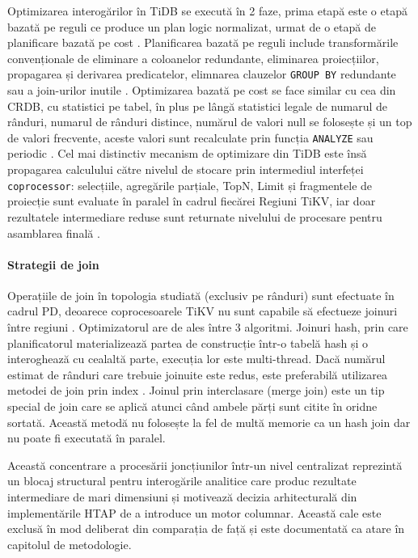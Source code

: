 Optimizarea interogărilor în TiDB se execută în 2 faze, prima etapă este o etapă bazată pe reguli ce produce un plan logic normalizat, urmat de o etapă de planificare bazată pe cost \cite{huangtidb2020}. Planificarea bazată pe reguli include transformările convenționale de eliminare a coloanelor redundante, eliminarea proiecțiilor, propagarea și derivarea predicatelor, elimnarea clauzelor \texttt{GROUP BY} redundante sau a join-urilor inutile \cite{huangtidb2020}. Optimizarea bazată pe cost se face similar cu cea din CRDB, cu statistici pe tabel, în plus pe lângă statistici legale de numarul de rânduri, numarul de rânduri distince, numărul de valori null se folosește și un top de valori frecvente, aceste valori sunt recalculate prin funcția \texttt{ANALYZE} sau periodic \cite{tidb_stats}. Cel mai distinctiv mecanism de optimizare din TiDB este însă propagarea calculului către nivelul de stocare prin intermediul interfeței \texttt{coprocessor}: selecțiile, agregările parțiale, TopN, Limit și fragmentele de proiecție sunt evaluate în paralel în cadrul fiecărei Regiuni TiKV, iar doar rezultatele intermediare reduse sunt returnate nivelului de procesare pentru asamblarea finală \cite{huangtidb2020}.

\paragraph{Strategii de join}

Operațiile de join în topologia studiată (exclusiv pe rânduri) sunt efectuate în cadrul PD, deoarece coprocesoarele TiKV nu sunt capabile să efectueze joinuri între regiuni \cite{tidb_joins, huangtidb2020}. Optimizatorul are de ales între 3 algoritmi. Joinuri hash, prin care planificatorul materializează partea de construcție într-o tabelă hash și o interoghează cu cealaltă parte, execuția lor este multi-thread. Dacă numărul estimat de rânduri care trebuie joinuite este redus, este preferabilă utilizarea metodei de join prin index \cite{tidb_joins}. Joinul prin interclasare (merge join) este un tip special de join care se aplică atunci când ambele părți sunt citite în oridne sortată. Această metodă nu folosește la fel de multă memorie ca un hash join dar nu poate fi executată în paralel.

Această concentrare a procesării joncțiunilor într-un nivel centralizat reprezintă un blocaj structural pentru interogările analitice care produc rezultate intermediare de mari dimensiuni și motivează decizia arhitecturală din implementările HTAP de a introduce un motor columnar. Această cale este exclusă în mod deliberat din comparația de față și este documentată ca atare în capitolul de metodologie.

